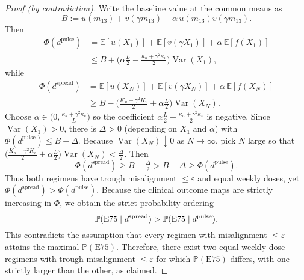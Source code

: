 \begin{proof}[Proof (by contradiction)]
Write the baseline value at the common means as
$$B:=u(m_{13})+v(\gamma m_{13})+\alpha\,u(m_{13})v(\gamma m_{13}).$$
Then
\begin{align*}
\Phi(d^{\mathrm{pulse}})
&=\mathbb E[u(X_1)]+\mathbb E[v(\gamma X_1)]+\alpha\,\mathbb E[f(X_1)]\\
&\le B+\Big(\alpha\tfrac{L}{2}-\tfrac{\kappa_u+\gamma^2\kappa_v}{2}\Big)\operatorname{Var}(X_1),
\end{align*}
while
\begin{align*}
\Phi(d^{\mathrm{spread}})
&=\mathbb E[u(X_N)]+\mathbb E[v(\gamma X_N)]+\alpha\,\mathbb E[f(X_N)]\\
&\ge B-\Big(\tfrac{K_u+\gamma^2K_v}{2}+\alpha\tfrac{L}{2}\Big)\operatorname{Var}(X_N).
\end{align*}
Choose $\alpha\in\big(0,\tfrac{\kappa_u+\gamma^2\kappa_v}{L}\big)$ so the coefficient $\alpha\tfrac{L}{2}-\tfrac{\kappa_u+\gamma^2\kappa_v}{2}$ is negative. Since $\operatorname{Var}(X_1)>0$, there is $\Delta>0$ (depending on $X_1$ and $\alpha$) with $\Phi(d^{\mathrm{pulse}})\le B-\Delta$. Because $\operatorname{Var}(X_N)\downarrow0$ as $N\to\infty$, pick $N$ large so that $\big(\tfrac{K_u+\gamma^2K_v}{2}+\alpha\tfrac{L}{2}\big)\operatorname{Var}(X_N)<\tfrac{\Delta}{2}$. Then
$$\Phi(d^{\mathrm{spread}})\ge B-\tfrac{\Delta}{2}>B-\Delta\ge\Phi(d^{\mathrm{pulse}}).$$
Thus both regimens have trough misalignment $\le\varepsilon$ and equal weekly doses, yet $\Phi(d^{\mathrm{spread}})>\Phi(d^{\mathrm{pulse}})$. Because the clinical outcome maps are strictly increasing in $\Phi$, we obtain the strict probability ordering
\[
\mathbb P(\mathrm{E75}\mid d^{\mathrm{spread}})>\mathbb P(\mathrm{E75}\mid d^{\mathrm{pulse}}).\qedhere
\]
This contradicts the assumption that every regimen with misalignment $\le\varepsilon$ attains the maximal $\mathbb P(\mathrm{E75})$. Therefore, there exist two equal-weekly-dose regimens with trough misalignment $\le\varepsilon$ for which $\mathbb P(\mathrm{E75})$ differs, with one strictly larger than the other, as claimed.
\end{proof}
